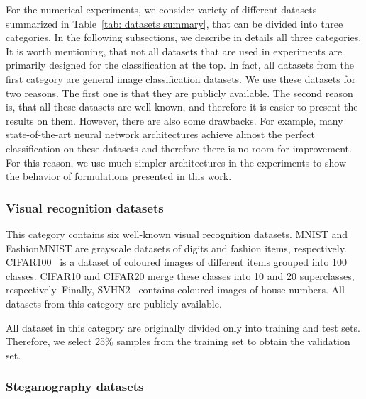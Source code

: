 For the numerical experiments, we consider variety of different datasets summarized in Table~\ref{tab: datasets summary}, that can be divided into three categories. In the following subsections, we describe in details all three categories. It is worth mentioning, that not all datasets that are used in experiments are primarily designed for the classification at the top. In fact, all datasets from the first category are general image classification datasets. We use these datasets for two reasons. The first one is that they are publicly available. The second reason is, that all these datasets are well known, and therefore it is easier to present the results on them. However, there are also some drawbacks. For example, many state-of-the-art neural network architectures achieve almost the perfect classification on these datasets and therefore there is no room for improvement. For this reason, we use much simpler architectures in the experiments to show the behavior of formulations presented in this work.

\subsubsection{Visual recognition datasets}

This category contains six well-known visual recognition datasets. MNIST \cite{deng2012mnist} and FashionMNIST \cite{xiao2017fashionmnist} are grayscale datasets of digits and fashion items, respectively. CIFAR100~\cite{krizhevsky2009learning} is a dataset of coloured images of different items grouped into 100 classes. CIFAR10 and CIFAR20 merge these classes into 10 and 20 superclasses, respectively. Finally, SVHN2~\cite{netzer2011reading} contains coloured images of house numbers. All datasets from this category are publicly available.

All dataset in this category are originally divided only into training and test sets. Therefore, we select 25\% samples from the training set to obtain the validation set. 

\subsubsection{Steganography datasets}

